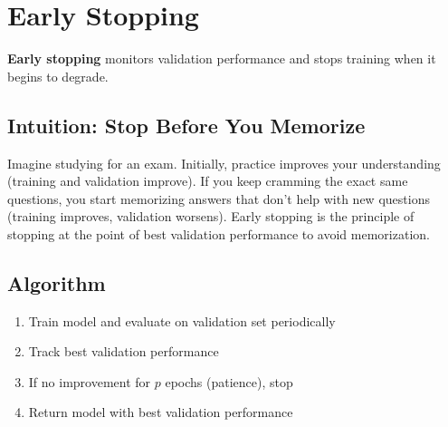 
\section{Early Stopping }
\label{sec:early-stopping}

\textbf{Early stopping} monitors validation performance and stops training when it begins to degrade.

\subsection{Intuition: Stop Before You Memorize}

Imagine studying for an exam. Initially, practice improves your understanding (training and validation improve). If you keep cramming the exact same questions, you start memorizing answers that don't help with new questions (training improves, validation worsens). Early stopping is the principle of stopping at the point of best validation performance to avoid memorization.

\subsection{Algorithm}

\begin{enumerate}
    \item Train model and evaluate on validation set periodically
    \item Track best validation performance
    \item If no improvement for $p$ epochs (patience), stop
    \item Return model with best validation performance
\end{enumerate}

